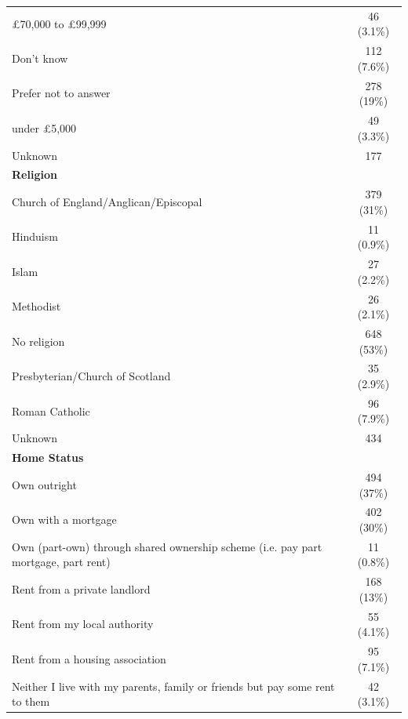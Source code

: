\documentclass[]{cupjournal}
\begin{document}
\begin{longtable}[t]{lc}
\hspace{1em}£70,000 to £99,999 & 46 (3.1\%)\\
\hspace{1em}Don't know & 112 (7.6\%)\\
\hspace{1em}Prefer not to answer & 278 (19\%)\\
\hspace{1em}under £5,000 & 49 (3.3\%)\\
\hspace{1em}Unknown & 177\\
\textbf{Religion} & \\
\hspace{1em}Church of England/Anglican/Episcopal & 379 (31\%)\\
\hspace{1em}Hinduism & 11 (0.9\%)\\
\hspace{1em}Islam & 27 (2.2\%)\\
\hspace{1em}Methodist & 26 (2.1\%)\\
\hspace{1em}No religion & 648 (53\%)\\
\hspace{1em}Presbyterian/Church of Scotland & 35 (2.9\%)\\
\hspace{1em}Roman Catholic & 96 (7.9\%)\\
\hspace{1em}Unknown & 434\\
\textbf{Home Status} & \\
\hspace{1em}Own outright & 494 (37\%)\\
\hspace{1em}Own with a mortgage & 402 (30\%)\\
\hspace{1em}Own (part-own) through shared ownership scheme (i.e. pay part mortgage, part rent) & 11 (0.8\%)\\
\hspace{1em}Rent from a private landlord & 168 (13\%)\\
\hspace{1em}Rent from my local authority & 55 (4.1\%)\\
\hspace{1em}Rent from a housing association & 95 (7.1\%)\\
\hspace{1em}Neither I live with my parents, family or friends but pay some rent to them & 42 (3.1\%)\\

\end{longtable}
\end{document}
